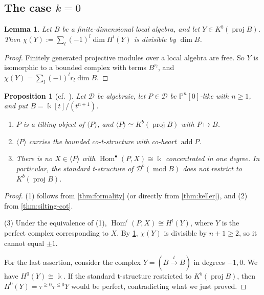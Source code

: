 \documentclass[11pt,reqno]{amsart}
\theoremstyle{plain}
\newtheorem{proposition}[theorem]{Proposition}
\newtheorem{lemma}[theorem]{Lemma}
\theoremstyle{definition}
\theoremstyle{remark}
\newcommand{\kk}{\Bbbk}
\DeclareMathOperator{\Hom}{Hom}
\DeclareMathOperator{\add}{add}
\newcommand{\modd}{\operatorname{mod}}
\newcommand{\proj}{\operatorname{proj}}
\newcommand{\Db}{\mathcal{D}^b}
\newcommand{\Kb}{K^b}
\newcommand{\thick}[1]{\langle #1\rangle}
\newcommand{\Pn}[2]{\mathbb{P}^{#1}[#2]}
\newcommand{\cD}{\mathcal{D}}
\begin{document}
\subsection{The case \texorpdfstring{$k=0$}{k=0}}

\begin{lemma}\label{lem:euler}
Let $B$ be a finite-dimensional local algebra, and let $Y\in\Kb(\proj B)$. Then $\chi(Y):=\sum_l(-1)^l\dim H^l(Y)$ is divisible by $\dim B$.
\end{lemma}

\begin{proof}
Finitely generated projective modules over a local algebra are free. So $Y$ is isomorphic to a bounded complex with terms $B^{r_l}$, and $\chi(Y)=\sum_l(-1)^lr_l\dim B$.
\end{proof}

\begin{proposition}[{cf.\ \cite[Prop.~2.4, \S3.2, Cor.~3.10]{Bonf26}}]\label{prop:k0}
Let $\cD$ be algebraic, let $P\in\cD$ be $\Pn n0$-like with $n\ge1$, and put $B=\kk[t]/(t^{n+1})$.
\begin{enumerate}
\item $P$ is a tilting object of $\thick P$, and $\thick P\simeq\Kb(\proj B)$ with $P\mapsto B$.
\item $\thick P$ carries the bounded co-t-structure with co-heart $\add P$.
\item There is no $X\in\thick P$ with $\Hom^\bullet(P,X)\cong\kk$ concentrated in one degree. In particular, the standard t-structure of $\Db(\modd B)$ does not restrict to $\Kb(\proj B)$.
\end{enumerate}
\end{proposition}

\begin{proof}
(1) follows from \cref{thm:formality} (or directly from \cref{thm:keller}), and (2) from \cref{thm:silting-cot}.

(3) Under the equivalence of (1), $\Hom^l(P,X)\cong H^l(Y)$, where $Y$ is the perfect complex corresponding to $X$. By \cref{lem:euler}, $\chi(Y)$ is divisible by $n+1\ge2$, so it cannot equal $\pm1$.

For the last assertion, consider the complex $Y=(B\xrightarrow{t}B)$ in degrees $-1,0$. We have $H^0(Y)\cong\kk$. If the standard t-structure restricted to $\Kb(\proj B)$, then $H^0(Y)=\tau^{\ge0}\tau^{\le0}Y$ would be perfect, contradicting what we just proved.
\end{proof}
\end{document}
